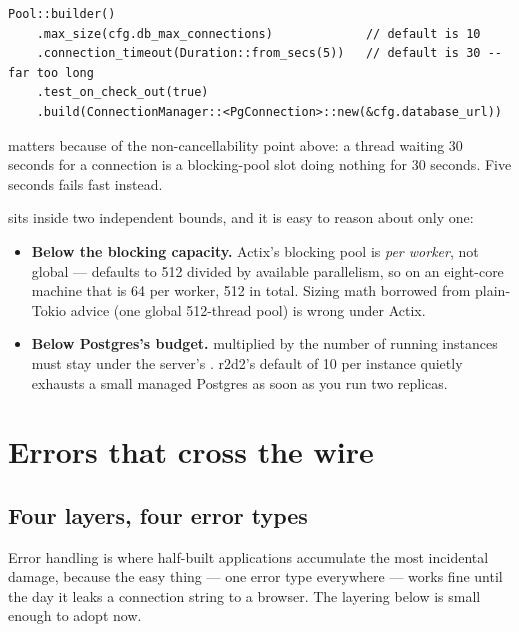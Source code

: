 \begin{lstlisting}[style=rs,caption={A pool built from configuration, with deliberate limits.}]
Pool::builder()
    .max_size(cfg.db_max_connections)             // default is 10
    .connection_timeout(Duration::from_secs(5))   // default is 30 -- far too long
    .test_on_check_out(true)
    .build(ConnectionManager::<PgConnection>::new(&cfg.database_url))
\end{lstlisting}

 matters because of the non-cancellability point above: a thread waiting
30 seconds for a connection is a blocking-pool slot doing nothing for 30 seconds. Five seconds
fails fast instead.

 sits inside two independent bounds, and it is easy to reason about only one:

\begin{itemize}
  \item \textbf{Below the blocking capacity.} Actix's blocking pool is \emph{per worker}, not
    global ---  defaults to 512 divided by available
    parallelism, so on an eight-core machine that is 64 per worker, 512 in total. Sizing math
    borrowed from plain-Tokio advice (one global 512-thread pool) is wrong under Actix.
  \item \textbf{Below Postgres's budget.}  multiplied by the number of running
    instances must stay under the server's . r2d2's default of 10 per
    instance quietly exhausts a small managed Postgres as soon as you run two replicas.
\end{itemize}

\chapter{Errors that cross the wire}
\label{ch:errors}

\section{Four layers, four error types}

Error handling is where half-built applications accumulate the most incidental damage, because the
easy thing --- one error type everywhere --- works fine until the day it leaks a connection string
to a browser. The layering below is small enough to adopt now.

